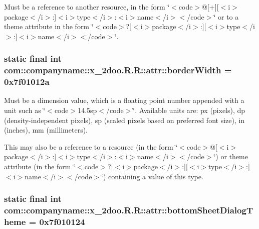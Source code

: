 Must be a reference to another resource, in the form \char`\"{}$<$code$>$@\mbox{[}+\mbox{]}\mbox{[}$<$i$>$package$<$/i$>$:\mbox{]}$<$i$>$type$<$/i$>$:$<$i$>$name$<$/i$>$$<$/code$>$\char`\"{} or to a theme attribute in the form \char`\"{}$<$code$>$?\mbox{[}$<$i$>$package$<$/i$>$:\mbox{]}\mbox{[}$<$i$>$type$<$/i$>$:\mbox{]}$<$i$>$name$<$/i$>$$<$/code$>$\char`\"{}. \hypertarget{classcom_1_1companyname_1_1x__2doo_1_1_r_1_1attr_66376b83d12af2c50f72ee1e4d3a793e}{
\subsubsection[{borderWidth}]{\setlength{\rightskip}{0pt plus 5cm}static final int com::companyname::x\_\-2doo.R.R::attr::borderWidth = 0x7f01012a}}
\label{classcom_1_1companyname_1_1x__2doo_1_1_r_1_1attr_66376b83d12af2c50f72ee1e4d3a793e}


Must be a dimension value, which is a floating point number appended with a unit such as \char`\"{}$<$code$>$14.5sp$<$/code$>$\char`\"{}. Available units are: px (pixels), dp (density-independent pixels), sp (scaled pixels based on preferred font size), in (inches), mm (millimeters). 

This may also be a reference to a resource (in the form \char`\"{}$<$code$>$@\mbox{[}$<$i$>$package$<$/i$>$:\mbox{]}$<$i$>$type$<$/i$>$:$<$i$>$name$<$/i$>$$<$/code$>$\char`\"{}) or theme attribute (in the form \char`\"{}$<$code$>$?\mbox{[}$<$i$>$package$<$/i$>$:\mbox{]}\mbox{[}$<$i$>$type$<$/i$>$:\mbox{]}$<$i$>$name$<$/i$>$$<$/code$>$\char`\"{}) containing a value of this type. \hypertarget{classcom_1_1companyname_1_1x__2doo_1_1_r_1_1attr_b567ed4604f4c06b025cc4622ee68e09}{
\subsubsection[{bottomSheetDialogTheme}]{\setlength{\rightskip}{0pt plus 5cm}static final int com::companyname::x\_\-2doo.R.R::attr::bottomSheetDialogTheme = 0x7f010124}}
\label{classcom_1_1companyname_1_1x__2doo_1_1_r_1_1attr_b567ed4604f4c06b025cc4622ee68e09}


